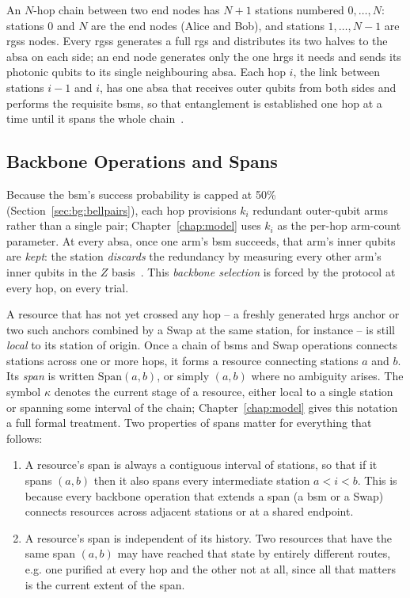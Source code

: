 An $N$-hop chain between two end nodes has $N+1$ stations numbered $0,\dots,N$: stations $0$ and $N$ are the end nodes (Alice and Bob), and stations $1,\dots,N-1$ are \Gls{rgss} nodes. Every \Gls{rgss} generates a full \Gls{rgs} and distributes its two halves to the \Gls{absa} on each side; an end node generates only the one \Gls{hrgs} it needs and sends its photonic qubits to its single neighbouring \Gls{absa}. Each hop $i$, the link between stations $i-1$ and $i$, has one \Gls{absa} that receives outer qubits from both sides and performs the requisite \Glspl{bsm}, so that entanglement is established one hop at a time until it spans the whole chain~\cite{Benchasattabuse2026Bridging}.

\subsection{Backbone Operations and Spans}
\label{sec:bg:backbone}

Because the \Gls{bsm}'s success probability is capped at 50\% (Section~\ref{sec:bg:bellpairs}), each hop provisions $k_i$ redundant outer-qubit arms rather than a single pair; Chapter~\ref{chap:model} uses $k_i$ as the per-hop arm-count parameter. At every \Gls{absa}, once one arm's \Gls{bsm} succeeds, that arm's inner qubits are \emph{kept}: the station \emph{discards} the redundancy by measuring every other arm's inner qubits in the $Z$ basis~\cite{Azuma2015All,Benchasattabuse2026Bridging}. This \emph{backbone selection} is forced by the protocol at every hop, on every trial.

A resource that has not yet crossed any hop -- a freshly generated \Gls{hrgs} anchor or two such anchors combined by a Swap at the same station, for instance -- is still \emph{local} to its station of origin. Once a chain of \Glspl{bsm} and Swap operations connects stations across one or more hops, it forms a resource connecting stations $a$ and $b$. Its \emph{span} is written $\mathrm{Span}(a,b)$, or simply $(a,b)$ where no ambiguity arises. The symbol $\kappa$ denotes the current stage of a resource, either local to a single station or spanning some interval of the chain; Chapter~\ref{chap:model} gives this notation a full formal treatment. Two properties of spans matter for everything that follows:

\begin{enumerate}
    \item A resource's span is always a contiguous interval of stations, so that if it spans $(a,b)$ then it also spans every intermediate station $a < i < b$. This is because every backbone operation that extends a span (a \Gls{bsm} or a Swap) connects resources across adjacent stations or at a shared endpoint.
    \item A resource's span is independent of its history. Two resources that have the same span $(a,b)$ may have reached that state by entirely different routes, e.g. one purified at every hop and the other not at all, since all that matters is the current extent of the span.
\end{enumerate}


